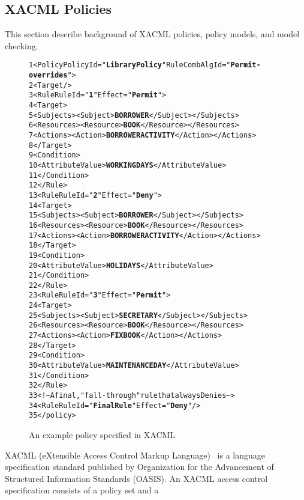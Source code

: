\subsection{XACML Policies}
This section describe background of XACML policies, policy models, and model checking.
\begin{figure}[t]%
\begin{CodeOut}
\begin{alltt}
 1 <Policy PolicyId="\textbf{Library Policy}" RuleCombAlgId="\textbf{Permit-overrides}">
 2  <Target/>
 3    <Rule RuleId="\textbf{1}" Effect="\textbf{Permit}">
 4      <Target>
 5        <Subjects><Subject> \textbf{BORROWER} </Subject></Subjects>
 6        <Resources><Resource> \textbf{BOOK} </Resource></Resources>
 7        <Actions><Action> \textbf{BORROWERACTIVITY} </Action></Actions>
 8      </Target>
 9	    <Condition>
10        <AttributeValue> \textbf{WORKINGDAYS} </AttributeValue>
11      </Condition>
12    </Rule>
13    <Rule RuleId="\textbf{2}" Effect="\textbf{Deny}">
14      <Target>
15        <Subjects><Subject> \textbf{BORROWER} </Subject></Subjects>
16        <Resources><Resource> \textbf{BOOK} </Resource></Resources>
17        <Actions><Action> \textbf{BORROWERACTIVITY} </Action></Actions>
18      </Target>
19	    <Condition>
20        <AttributeValue> \textbf{HOLIDAYS} </AttributeValue>
21      </Condition>
22    </Rule>
23    <Rule RuleId="\textbf{3}" Effect="\textbf{Permit}">
24      <Target>
25        <Subjects><Subject> \textbf{SECRETARY} </Subject></Subjects>
26        <Resources><Resource> \textbf{BOOK} </Resource></Resources>
27        <Actions><Action> \textbf{FIXBOOK} </Action></Actions>
28      </Target>
29	    <Condition>
30        <AttributeValue> \textbf{MAINTENANCEDAY} </AttributeValue>
31      </Condition>
32    </Rule>
33      <!-- A final, "fall-through" rule that always Denies -->
34    <Rule RuleId="\textbf{FinalRule}" Effect="\textbf{Deny}"/>
35 </policy>
\end{alltt}
\end{CodeOut}

\vspace*{-3.0ex} \caption{An example policy specified in XACML}
 \label{fig:example}
\end{figure}
XACML (eXtensible Access Control Markup
Language)~\cite{oasis05:xacml} is a language specification standard
published by Organization for the Advancement of Structured
Information Standards (OASIS).
An XACML access control specification consists of a policy set and a
